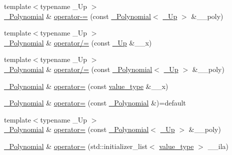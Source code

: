 \begin{DoxyCompactItemize}
\item 
{\footnotesize template$<$typename \+\_\+\+Up $>$ }\\\hyperlink{class____gnu__cxx_1_1__Polynomial}{\+\_\+\+Polynomial} \& \hyperlink{class____gnu__cxx_1_1__Polynomial_af092dce5f209610ec20ea84ccfe0a5f1}{operator-\/=} (const \hyperlink{class____gnu__cxx_1_1__Polynomial}{\+\_\+\+Polynomial}$<$ \hyperlink{class____gnu__cxx_1_1__Polynomial_a242114d4b86648a5dff67a8221f80d40}{\+\_\+\+Up} $>$ \&\+\_\+\+\_\+poly)
\item 
{\footnotesize template$<$typename \+\_\+\+Up $>$ }\\\hyperlink{class____gnu__cxx_1_1__Polynomial}{\+\_\+\+Polynomial} \& \hyperlink{class____gnu__cxx_1_1__Polynomial_a3fbb600980f4945af2733c9e10228079}{operator/=} (const \hyperlink{class____gnu__cxx_1_1__Polynomial_a242114d4b86648a5dff67a8221f80d40}{\+\_\+\+Up} \&\+\_\+\+\_\+x)
\item 
{\footnotesize template$<$typename \+\_\+\+Up $>$ }\\\hyperlink{class____gnu__cxx_1_1__Polynomial}{\+\_\+\+Polynomial} \& \hyperlink{class____gnu__cxx_1_1__Polynomial_a3374e3ab44ed1478de27f688aae6c3f1}{operator/=} (const \hyperlink{class____gnu__cxx_1_1__Polynomial}{\+\_\+\+Polynomial}$<$ \hyperlink{class____gnu__cxx_1_1__Polynomial_a242114d4b86648a5dff67a8221f80d40}{\+\_\+\+Up} $>$ \&\+\_\+\+\_\+poly)
\item 
\hyperlink{class____gnu__cxx_1_1__Polynomial}{\+\_\+\+Polynomial} \& \hyperlink{class____gnu__cxx_1_1__Polynomial_a207a09b3f170adcfbf21c26821c864dd}{operator=} (const \hyperlink{class____gnu__cxx_1_1__Polynomial_a725563351f50e76084a7a016c06f8a53}{value\+\_\+type} \&\+\_\+\+\_\+x)
\item 
\hyperlink{class____gnu__cxx_1_1__Polynomial}{\+\_\+\+Polynomial} \& \hyperlink{class____gnu__cxx_1_1__Polynomial_a96aa1f47da636376d63cf099558113b8}{operator=} (const \hyperlink{class____gnu__cxx_1_1__Polynomial}{\+\_\+\+Polynomial} \&)=default
\item 
{\footnotesize template$<$typename \+\_\+\+Up $>$ }\\\hyperlink{class____gnu__cxx_1_1__Polynomial}{\+\_\+\+Polynomial} \& \hyperlink{class____gnu__cxx_1_1__Polynomial_ab3287f4f0300adc76216e7fabeb62d7d}{operator=} (const \hyperlink{class____gnu__cxx_1_1__Polynomial}{\+\_\+\+Polynomial}$<$ \hyperlink{class____gnu__cxx_1_1__Polynomial_a242114d4b86648a5dff67a8221f80d40}{\+\_\+\+Up} $>$ \&\+\_\+\+\_\+poly)
\item 
\hyperlink{class____gnu__cxx_1_1__Polynomial}{\+\_\+\+Polynomial} \& \hyperlink{class____gnu__cxx_1_1__Polynomial_a44394532a2b1e67f1613b35402da9d47}{operator=} (std\+::initializer\+\_\+list$<$ \hyperlink{class____gnu__cxx_1_1__Polynomial_a725563351f50e76084a7a016c06f8a53}{value\+\_\+type} $>$ \+\_\+\+\_\+ila)

\end{DoxyCompactItemize}
